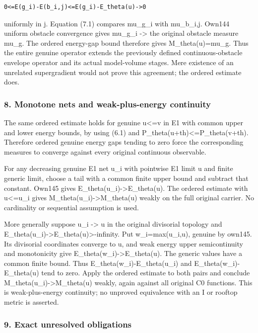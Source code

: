 \documentclass[
  10pt,
]{article}
\begin{document}
\begin{verbatim}
0<=E(g_i)-E(b_i,j)<=E(g_i)-E_theta(u)->0
\end{verbatim}

uniformly in j. Equation (7.1) compares mu\_g\_i with mu\_b\_i,j. Own144
uniform obstacle convergence gives mu\_g\_i -\textgreater{} the original
obstacle measure mu\_g. The ordered energy-gap bound therefore gives
M\_theta(u)=mu\_g. Thus the entire genuine operator extends the
previously defined continuous-obstacle envelope operator and its actual
model-volume stages. Mere existence of an unrelated supergradient would
not prove this agreement; the ordered estimate does.

\subsubsection{8. Monotone nets and weak-plus-energy
continuity}\label{monotone-nets-and-weak-plus-energy-continuity}

The same ordered estimate holds for genuine u\textless=v in E1 with
common upper and lower energy bounds, by using (6.1) and
P\_theta(u+th)\textless=P\_theta(v+th). Therefore ordered genuine energy
gaps tending to zero force the corresponding measures to converge
against every original continuous observable.

For any decreasing genuine E1 net u\_i with pointwise E1 limit u and
finite generic limit, choose a tail with a common finite upper bound and
subtract that constant. Own145 gives
E\_theta(u\_i)-\textgreater E\_theta(u). The ordered estimate with
u\textless=u\_i gives M\_theta(u\_i)-\textgreater M\_theta(u) weakly on
the full original carrier. No cardinality or sequential assumption is
used.

More generally suppose u\_i -\textgreater{} u in the original divisorial
topology and
E\_theta(u\_i)-\textgreater E\_theta(u)\textgreater-infinity. Put
w\_i=max(u\_i,u), genuine by own145. Its divisorial coordinates converge
to u, and weak energy upper semicontinuity and monotonicity give
E\_theta(w\_i)-\textgreater E\_theta(u). The generic values have a
common finite bound. Thus E\_theta(w\_i)-E\_theta(u\_i) and
E\_theta(w\_i)-E\_theta(u) tend to zero. Apply the ordered estimate to
both pairs and conclude M\_theta(u\_i)-\textgreater M\_theta(u) weakly,
again against all original C0 functions. This is weak-plus-energy
continuity; no unproved equivalence with an I or rooftop metric is
asserted.

\subsubsection{9. Exact unresolved
obligations}\label{exact-unresolved-obligations}
\end{document}
